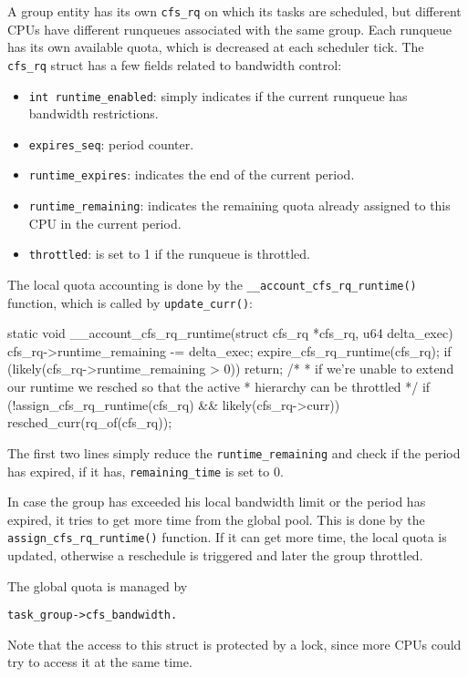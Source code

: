 A group entity has its own \verb|cfs_rq| on which its tasks are scheduled, but different CPUs have different runqueues associated with the same group. Each runqueue has its own available quota, which is decreased at each scheduler tick. The \verb|cfs_rq| struct has a few fields related to bandwidth control:
\begin{itemize}
    \item \verb|int runtime_enabled|: simply indicates if the current runqueue has bandwidth restrictions.
    \item \verb|expires_seq|: period counter.
    \item \verb|runtime_expires|: indicates the end of the current period.
    \item \verb|runtime_remaining|: indicates the remaining quota already assigned to this CPU in the current period.
    \item \verb|throttled|: is set to 1 if the runqueue is throttled.
\end{itemize}

The local quota accounting is done by the \verb|__account_cfs_rq_runtime()| function, which is called by \verb|update_curr()|:
\begin{code}
static void __account_cfs_rq_runtime(struct cfs_rq *cfs_rq, u64 delta_exec)
{
	cfs_rq->runtime_remaining -= delta_exec;
	expire_cfs_rq_runtime(cfs_rq);
	if (likely(cfs_rq->runtime_remaining > 0))
		return;
	/*
	 * if we're unable to extend our runtime we resched so that the active
	 * hierarchy can be throttled
	 */
	if (!assign_cfs_rq_runtime(cfs_rq) && likely(cfs_rq->curr))
		resched_curr(rq_of(cfs_rq));
}
\end{code}

The first two lines simply reduce the \verb|runtime_remaining| and check if the period has expired, if it has, \verb|remaining_time| is set to 0.

In case the group has exceeded his local bandwidth limit or the period has expired, it tries to get more time from the global pool. This is done by the \verb|assign_cfs_rq_runtime()| function. If it can get more time, the local quota is updated, otherwise a reschedule is triggered and later the group throttled.

The global quota is managed by 
\begin{verbatim}
task_group->cfs_bandwidth.
\end{verbatim}
Note that the access to this struct is protected by a lock, since more CPUs could try to access it at the same time.

